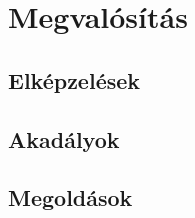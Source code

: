 \chapter{Megvalósítás}\label{ch:MEGVALOSITAS}
\section{Elképzelések}\label{ch:MEGVALOSITAS:elkepzeles}
\section{Akadályok}\label{ch:MEGVALOSITAS:akadaly}
\section{Megoldások}\label{ch:MEGVALOSITAS:megoldas}